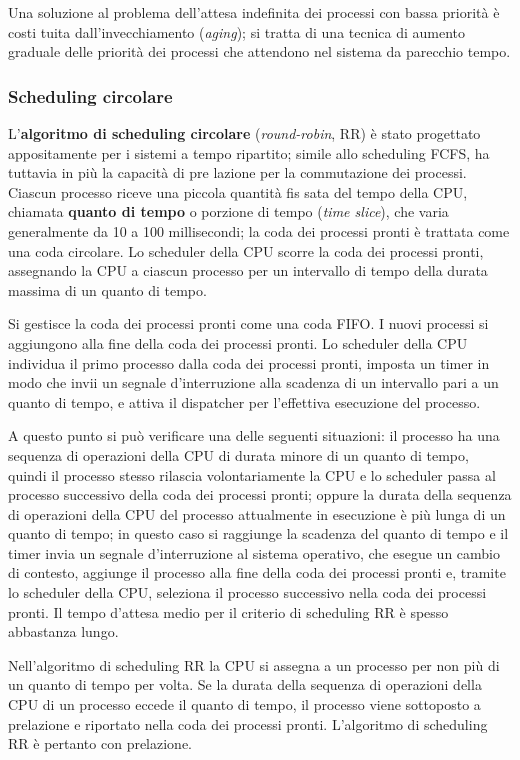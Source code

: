 \documentclass[11pt,a4paper]{article}
\begin{document}
Una soluzione al problema dell'attesa indefinita dei processi con bassa priorità è costi­
tuita dall'invecchiamento (\emph{aging}); si tratta di una tecnica di aumento graduale delle priorità
dei processi che attendono nel sistema da parecchio tempo.

\subsubsection{Scheduling circolare}
L'\textbf{algoritmo di scheduling circolare} (\emph{round-robin},  RR) è stato progettato appositamente per
i sistemi a tempo ripartito; simile allo scheduling FCFS, ha tuttavia in più la capacità di pre­
lazione per la commutazione dei processi. Ciascun processo riceve una piccola quantità fis­
sata del tempo della CPU, chiamata \textbf{quanto di tempo} o porzione di tempo (\emph{time slice}), che
varia generalmente da 10 a 100 millisecondi; la coda dei processi pronti è trattata come una
coda circolare. Lo scheduler della CPU scorre la coda dei processi pronti, assegnando la CPU
a ciascun processo per un intervallo di tempo della durata massima di un quanto di tempo.

Si gestisce la coda dei processi pronti come una coda FI­FO. I nuovi processi si aggiungono alla fine della coda dei processi pronti. Lo scheduler del­la CPU individua il primo processo dalla coda dei processi pronti, imposta un timer in mo­do che invii un segnale d'interruzione alla scadenza di un intervallo pari a un quanto di tem­po, e attiva il dispatcher per l'effettiva esecuzione del processo.

A questo punto si può verificare una delle seguenti situazioni: il processo ha una se­quenza di operazioni della CPU di durata minore di un quanto di tempo, quindi il processo
stesso rilascia volontariamente la CPU e lo scheduler passa al processo successivo della coda
dei processi pronti; oppure la durata della sequenza di operazioni della CPU del processo attualmente in esecuzione è più lunga di un quanto di tempo; in questo caso si raggiunge la
scadenza del quanto di tempo e il timer invia un segnale d'interruzione al sistema operativo,
che esegue un cambio di contesto, aggiunge il processo alla fine della coda dei processi pron­ti e, tramite lo scheduler della CPU, seleziona il processo successivo nella coda dei processi
pronti. Il tempo d'attesa medio per il criterio di scheduling RR è spesso abbastanza lungo.

Nell'algoritmo di scheduling RR la CPU si assegna a un processo per non più di un
quanto di tempo per volta. Se la durata della sequenza di operazioni della CPU di un proces­so eccede il quanto di tempo, il processo viene sottoposto a prelazione e riportato nella coda
dei processi pronti. L'algoritmo di scheduling RR è pertanto con prelazione.
\end{document}
